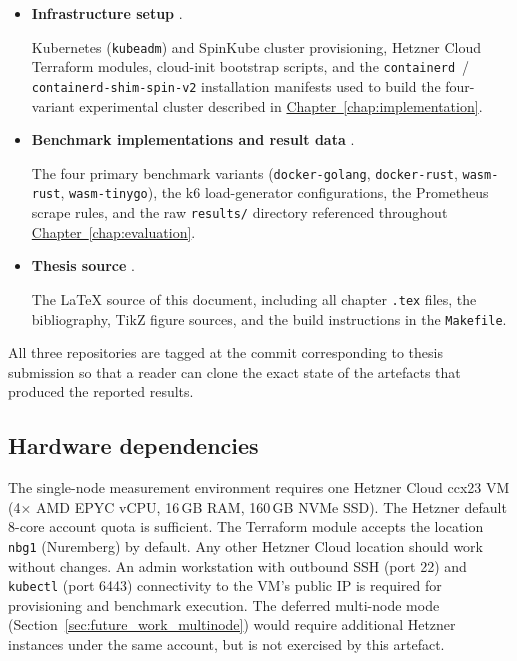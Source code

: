 \begin{itemize}
    \item \textbf{Infrastructure setup} \textendash{} \cite{musaev2026thesisinfra}.
\begin{sloppypar}
          Kubernetes (\texttt{kubeadm}) and SpinKube cluster provisioning, Hetzner Cloud Terraform modules, cloud-init bootstrap scripts, and the \texttt{containerd}~/ \texttt{containerd-shim-spin-v2} installation manifests used to build the four-variant experimental cluster described in \hyperref[chap:implementation]{Chapter~\ref{chap:implementation}}.
\end{sloppypar}

    \item \textbf{Benchmark implementations and result data} \textendash{} \cite{musaev2026thesisexperiments}.
\begin{sloppypar}
          The four primary benchmark variants (\texttt{docker-golang}, \texttt{docker-rust}, \texttt{wasm-rust}, \texttt{wasm-tinygo}), the k6 load-generator configurations, the Prometheus scrape rules, and the raw \texttt{results/} directory referenced throughout \hyperref[chap:evaluation]{Chapter~\ref{chap:evaluation}}.
\end{sloppypar}

    \item \textbf{Thesis source} \textendash{} \cite{musaev2026thesissource}.
\begin{sloppypar}
          The \LaTeX{} source of this document, including all chapter \texttt{.tex} files, the bibliography, TikZ figure sources, and the build instructions in the \texttt{Makefile}.
\end{sloppypar}
\end{itemize}

All three repositories are tagged at the commit corresponding to thesis submission so that a reader can clone the exact state of the artefacts that produced the reported results.

\subsection{Hardware dependencies}
\label{sec:repro_hardware}

\begin{sloppypar}
The single-node measurement environment requires one Hetzner Cloud ccx23 \acs{VM} (4$\times$ AMD EPYC vCPU, 16\,GB \acs{RAM}, 160\,GB NVMe \acs{SSD}). The Hetzner default 8-core account quota is sufficient. The Terraform module accepts the location \texttt{nbg1} (Nuremberg) by default. Any other Hetzner Cloud location should work without changes. An admin workstation with outbound \acs{SSH} (port 22) and \texttt{kubectl} (port 6443) connectivity to the \acs{VM}'s public \acs{IP} is required for provisioning and benchmark execution. The deferred multi-node mode (Section~\ref{sec:future_work_multinode}) would require additional Hetzner instances under the same account, but is not exercised by this artefact.
\end{sloppypar}

